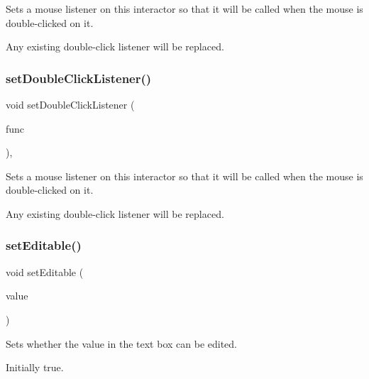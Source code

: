 Sets a mouse listener on this interactor so that it will be called when the mouse is double-\/clicked on it. 

Any existing double-\/click listener will be replaced. \mbox{\label{classGInteractor_a50096194d66f48c92dd4c512d41bfc76}} 
\subsubsection{\texorpdfstring{set\+Double\+Click\+Listener()}{setDoubleClickListener()}\hspace{0.1cm}{\footnotesize\ttfamily [2/2]}}
{\footnotesize\ttfamily void set\+Double\+Click\+Listener (\begin{DoxyParamCaption}\item[{G\+Event\+Listener\+Void}]{func }\end{DoxyParamCaption})\hspace{0.3cm}{\ttfamily [virtual]}, {\ttfamily [inherited]}}



Sets a mouse listener on this interactor so that it will be called when the mouse is double-\/clicked on it. 

Any existing double-\/click listener will be replaced. \mbox{\label{classGTextField_a008d7fd44fb3e7a6886cdaddbc3644a2}} 
\subsubsection{\texorpdfstring{set\+Editable()}{setEditable()}}
{\footnotesize\ttfamily void set\+Editable (\begin{DoxyParamCaption}\item[{bool}]{value }\end{DoxyParamCaption})\hspace{0.3cm}{\ttfamily [virtual]}}



Sets whether the value in the text box can be edited. 

Initially true. \mbox{\label{classGInteractor_ab831367dd84bbd579e02e55bacb21343}} 
